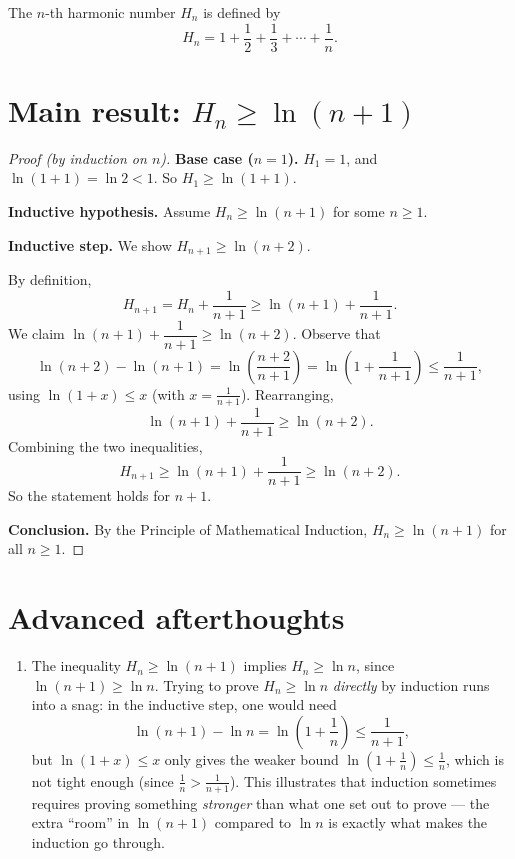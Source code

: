 \begin{solbox}[long]
\begin{solution}
    The $n$-th harmonic number $H_n$ is defined by
\[
    H_n = 1+\frac12+\frac13+\cdots+\frac1n.
\]

\section*{Main result: $H_n \ge \ln(n+1)$}

\begin{proof}[Proof (by induction on $n$)]
    \textbf{Base case ($n=1$).} $H_1=1$, and $\ln(1+1)=\ln2<1$. So
    $H_1 \ge \ln(1+1)$.

    \textbf{Inductive hypothesis.} Assume $H_n \ge \ln(n+1)$ for some
    $n\ge1$.

    \textbf{Inductive step.} We show $H_{n+1}\ge\ln(n+2)$.

    By definition,
    \[
        H_{n+1} = H_n+\frac{1}{n+1} \ge \ln(n+1)+\frac{1}{n+1}.
    \]
    We claim $\ln(n+1)+\dfrac{1}{n+1} \ge \ln(n+2)$. Observe that
    \[
        \ln(n+2)-\ln(n+1) = \ln\left(\frac{n+2}{n+1}\right)
        = \ln\left(1+\frac{1}{n+1}\right) \le \frac{1}{n+1},
    \]
    using $\ln(1+x)\le x$ (with $x=\frac{1}{n+1}$). Rearranging,
    \[
        \ln(n+1)+\frac{1}{n+1} \ge \ln(n+2).
    \]
    Combining the two inequalities,
    \[
        H_{n+1} \ge \ln(n+1)+\frac{1}{n+1} \ge \ln(n+2).
    \]
    So the statement holds for $n+1$.

    \textbf{Conclusion.} By the Principle of Mathematical Induction,
    $H_n \ge \ln(n+1)$ for all $n\ge1$.
\end{proof}

\section*{Advanced afterthoughts}

\begin{enumerate}
\item The inequality $H_n\ge\ln(n+1)$ implies $H_n\ge\ln n$, since
    $\ln(n+1)\ge\ln n$. Trying to prove $H_n\ge\ln n$ \emph{directly}
    by induction runs into a snag: in the inductive step, one would
    need
    \[
        \ln(n+1)-\ln n = \ln\left(1+\frac1n\right) \le \frac{1}{n+1},
    \]
    but $\ln(1+x)\le x$ only gives the weaker bound
    $\ln(1+\frac1n)\le\frac1n$, which is not tight enough (since
    $\frac1n > \frac{1}{n+1}$). This illustrates that induction
    sometimes requires proving something \emph{stronger} than what
    one set out to prove --- the extra ``room'' in $\ln(n+1)$
    compared to $\ln n$ is exactly what makes the induction go
    through.


\end{enumerate}
\end{solution}
\end{solbox}
